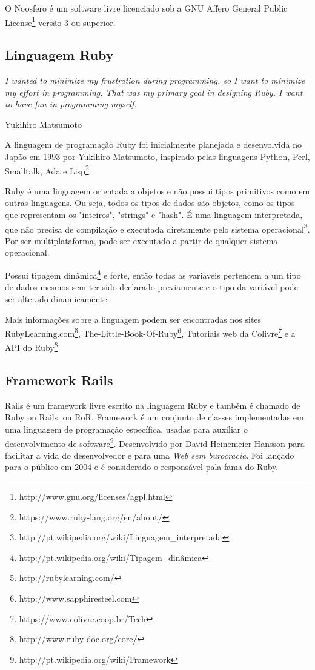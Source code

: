 \documentclass[[a4paper,11pt]{article}
\begin{document}
O Noosfero é um software livre licenciado sob a  GNU Affero General
Public License\footnote{http://www.gnu.org/licenses/agpl.html} versão 3 ou superior.

\subsection{Linguagem Ruby}

\epigraph{\textit{I wanted to minimize my frustration during programming, so I
want to minimize my effort in programming. That was my primary goal in
designing Ruby. I want to have fun in programming myself.}}{Yukihiro
Matsumoto}

A linguagem de programação Ruby foi inicialmente planejada e
desenvolvida no Japão em 1993 por Yukihiro
Matsumoto, inspirado pelas
linguagens Python, Perl, Smalltalk, Ada e
Lisp\footnote{https://www.ruby-lang.org/en/about/}.

Ruby é uma linguagem orientada a objetos e não possui tipos primitivos
como em outras linguagens. Ou seja, todos os tipos de dados são objetos,
como os tipos que representam os "inteiros", "strings" e "hash". É uma
linguagem interpretada, que não precisa de compilação e executada
diretamente pelo sistema
operacional\footnote{http://pt.wikipedia.org/wiki/Linguagem\_interpretada}.
Por ser multiplataforma, pode ser executado a partir de qualquer sistema
operacional.

Possui tipagem
dinâmica\footnote{http://pt.wikipedia.org/wiki/Tipagem\_dinâmica} e
forte, então todas as variáveis pertencem a um tipo de dados mesmos sem
ter sido declarado previamente e o tipo da variável pode ser alterado
dinamicamente.

Mais informações sobre a linguagem podem ser encontradas nos sites
RubyLearning.com\footnote{http://rubylearning.com/},
The-Little-Book-Of-Ruby\footnote{http://www.sapphiresteel.com},
Tutoriais web da Colivre\footnote{https://www.colivre.coop.br/Tech} e a
API do Ruby\footnote{http://www.ruby-doc.org/core/}

\subsection{Framework Rails}

Rails é um framework livre escrito na linguagem Ruby e também é chamado
de Ruby on Rails, ou RoR. Framework é um
conjunto de classes implementadas em uma linguagem de programação
específica, usadas para auxiliar o desenvolvimento de
software\footnote{http://pt.wikipedia.org/wiki/Framework}.
Desenvolvido por David Heinemeier Hansson para facilitar a vida do
desenvolvedor e para uma {\it Web sem burocracia}. Foi lançado para o
público em 2004 e é considerado o responsável pala fama do Ruby.
\end{document}
